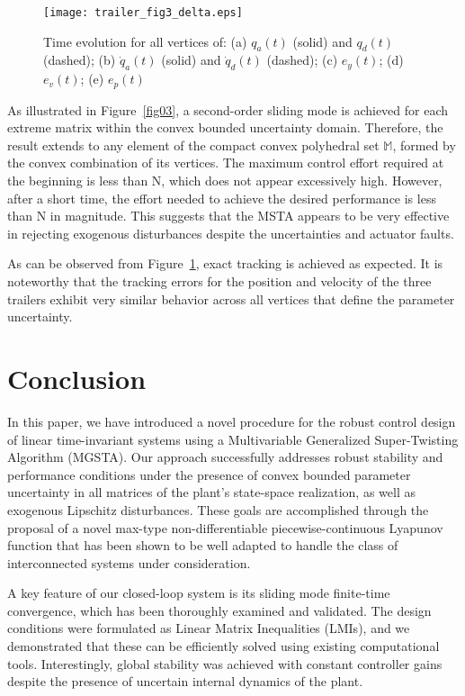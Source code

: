 \documentclass[twocolumn]{autarc_LH}
\begin{document}
\begin{figure}[t]
\hspace{0.7cm}\texttt{[image: trailer\_fig3\_delta.eps]}
\caption{Time evolution for all vertices of: (a) $q_a(t)$ (solid) and $q_d(t)$ (dashed); (b) $\dot{q}_a(t)$ (solid) and $\dot{q}_d(t)$ (dashed); (c) $e_y(t)$; (d) $e_v(t)$; (e) $e_p(t)$  }
\label{fig04}
\end{figure}

As illustrated in Figure~\ref{fig03}, a second-order sliding mode is achieved for each extreme matrix within the convex bounded uncertainty domain. Therefore, the result extends to any element of the compact convex polyhedral set $\mathbb{M}$, formed by the convex combination of its vertices. The maximum control effort required at the beginning is less than \unit[150]{N}, which does not appear excessively high. However, after a short time, the effort needed to achieve the desired performance is less than \unit[15]{N} in magnitude. This suggests that the MSTA appears to be very effective in rejecting exogenous disturbances despite the uncertainties and actuator faults.

As can be observed from Figure~\ref{fig04}, exact tracking is achieved as expected. It is noteworthy that the tracking errors for the position and velocity of the three trailers exhibit very similar behavior across all vertices that define the parameter uncertainty.

\section{Conclusion}


In this paper, we have introduced a novel procedure for the robust control design of linear time-invariant systems using a Multivariable Generalized Super-Twisting Algorithm (MGSTA). Our approach successfully addresses robust stability and performance conditions under the presence of convex bounded parameter uncertainty in all matrices of the plant's state-space realization, as well as exogenous  Lipschitz disturbances. These goals are accomplished through the proposal of a novel max-type non-differentiable piecewise-continuous Lyapunov function that has been shown to be well adapted to handle the class of interconnected systems under consideration.

A key feature of our closed-loop system is its sliding mode finite-time convergence, which has been thoroughly examined and validated. The design conditions were formulated as Linear Matrix Inequalities (LMIs), and we demonstrated that these can be efficiently solved using existing computational tools. Interestingly, global stability was achieved with constant controller gains despite the presence of uncertain internal dynamics of the plant.
\end{document}
